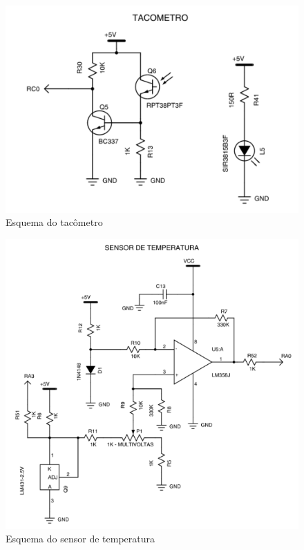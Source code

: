 \documentclass{article}
\begin{document}
\begin{figure}[H]
	\centering
	\includegraphics[width=0.9\linewidth]{esq_sensor}
	\caption{Esquema do tacômetro}
	\label{fig:esq_sensor}
\end{figure}
\begin{figure}[H]
	\centering
	\includegraphics[width=0.9\linewidth]{esq_sensorTemp}
	\caption{Esquema do sensor de temperatura}
	\label{fig:esq_sesorTemp}
\end{figure}
\end{document}

